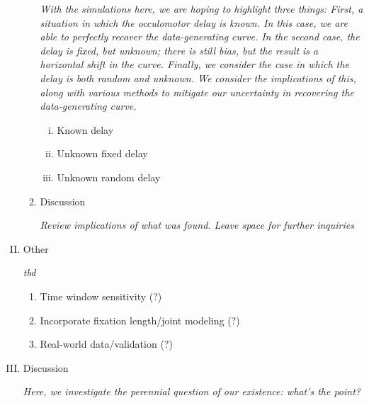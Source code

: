 \documentclass[12pt, letterpaper, twoside]{article}
\begin{document}
\begin{enumerate}[I.]
\begin{enumerate}[1.]
\textit{With the simulations here, we are hoping to highlight three things: First, a situation in which the occulomotor delay is known. In this case, we are able to perfectly recover the data-generating curve. In the second case, the delay is fixed, but unknown; there is still bias, but the result is a horizontal shift in the curve. Finally, we consider the case in which the delay is both random and unknown. We consider the implications of this, along with various methods to mitigate our uncertainty in recovering the data-generating curve.}
  
    \begin{enumerate}[i.]
    \item Known delay
    \item Unknown fixed delay
    \item Unknown random delay
    \end{enumerate}
  \item Discussion

  \textit{Review implications of what was found. Leave space for further inquiries}  
  
  \end{enumerate}
\item Other

\textit{tbd}
  \begin{enumerate}[1.]
  \item Time window sensitivity (?)
  \item Incorporate fixation length/joint modeling (?)
  \item Real-world data/validation (?)
  \end{enumerate}
\item Discussion

\textit{Here, we investigate the perennial question of our existence: what's the point?}

\end{enumerate}
\end{document}
